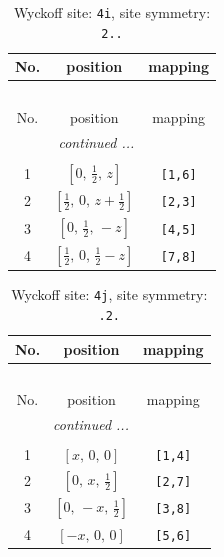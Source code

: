 \documentclass[fleqn,8pt]{jsarticle}
\begin{document}
\renewcommand{\arraystretch}{1.2}
\begin{longtable}{ccc}
\caption{Wyckoff site: {\tt 4i}, site symmetry: {\tt 2..}}
 \\
 \hline \hline
No. & position & mapping \\ \hline \endfirsthead

\multicolumn{2}{l}{\tablename\ \thetable{}} \\
 \hline \hline
No. & position & mapping \\ \hline \endhead

 \hline \hline
\multicolumn{2}{r}{\footnotesize\it continued ...} \\ \endfoot

 \hline \hline
\multicolumn{2}{r}{} \\ \endlastfoot

1 & $\left[ 0,\, \frac{1}{2},\, z \right]$ & {\tt [1,6]} \\ \hline
2 & $\left[ \frac{1}{2},\, 0,\, z + \frac{1}{2} \right]$ & {\tt [2,3]} \\ \hline
3 & $\left[ 0,\, \frac{1}{2},\, - z \right]$ & {\tt [4,5]} \\ \hline
4 & $\left[ \frac{1}{2},\, 0,\, \frac{1}{2} - z \right]$ & {\tt [7,8]} \\
\end{longtable}
\renewcommand{\arraystretch}{1.2}
\begin{longtable}{ccc}
\caption{Wyckoff site: {\tt 4j}, site symmetry: {\tt .2.}}
 \\
 \hline \hline
No. & position & mapping \\ \hline \endfirsthead

\multicolumn{2}{l}{\tablename\ \thetable{}} \\
 \hline \hline
No. & position & mapping \\ \hline \endhead

 \hline \hline
\multicolumn{2}{r}{\footnotesize\it continued ...} \\ \endfoot

 \hline \hline
\multicolumn{2}{r}{} \\ \endlastfoot

1 & $\left[ x,\, 0,\, 0 \right]$ & {\tt [1,4]} \\ \hline
2 & $\left[ 0,\, x,\, \frac{1}{2} \right]$ & {\tt [2,7]} \\ \hline
3 & $\left[ 0,\, - x,\, \frac{1}{2} \right]$ & {\tt [3,8]} \\ \hline
4 & $\left[ - x,\, 0,\, 0 \right]$ & {\tt [5,6]} \\
\end{longtable}
\end{document}
